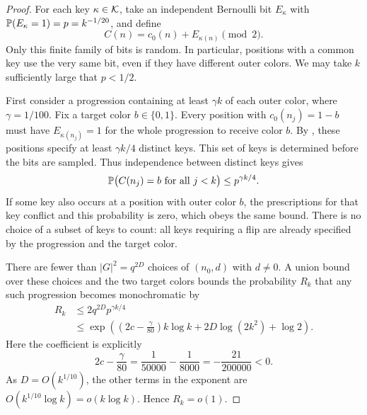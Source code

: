\begin{proof}
For each key $\kappa\in\mathcal K$, take an independent Bernoulli bit
$E_\kappa$ with $\mathbb P(E_\kappa=1)=p=k^{-1/20}$, and define
\begin{equation}\label{perturb:final-coloring}
 C(n)=c_0(n)+E_{\kappa(n)}\pmod2.
\end{equation}
Only this finite family of bits is random.  In particular, positions
with a common key use the very same bit, even if they have different
outer colors.  We may take $k$ sufficiently large that $p<1/2$.

First consider a progression containing at least $\gamma k$ of each
outer color, where $\gamma=1/100$.  Fix a target color $b\in\{0,1\}$.
Every position with $c_0(n_j)=1-b$ must have $E_{\kappa(n_j)}=1$ for
the whole progression to receive color $b$.  By
, these positions specify at least
$\gamma k/4$ distinct keys.  This set of keys is determined before
the bits are sampled.  Thus independence between distinct keys gives
\[
 \mathbb P\bigl(C(n_j)=b\text{ for all }j<k\bigr)
 \le p^{\gamma k/4}.
\]
If some key also occurs at a position with outer color $b$, the
prescriptions for that key conflict and this probability is zero,
which obeys the same bound.  There is no choice of a subset of keys to
count: all keys requiring a flip are already specified by the
progression and the target color.

There are fewer than $|G|^2=q^{2D}$ choices of $(n_0,d)$ with $d\ne0$.
A union bound over these choices and the two target colors bounds the
probability $R_k$ that any such progression becomes monochromatic by
\begin{equation}\label{perturb:rich-bound}
 \begin{aligned}
 R_k&\le 2q^{2D}p^{\gamma k/4}\\
 &\le\exp\!\left(
       \left(2c-\frac{\gamma}{80}\right)k\log k
       +2D\log(2k^2)+\log2\right).
 \end{aligned}
\end{equation}
Here the coefficient is explicitly
\begin{equation}\label{perturb:negative-coefficient}
 2c-\frac{\gamma}{80}
 =\frac{1}{50000}-\frac{1}{8000}
 =-\frac{21}{200000}<0.
\end{equation}
As $D=O(k^{1/10})$, the other terms in the exponent are
$O(k^{1/10}\log k)=o(k\log k)$.  Hence $R_k=o(1)$.


\end{proof}
